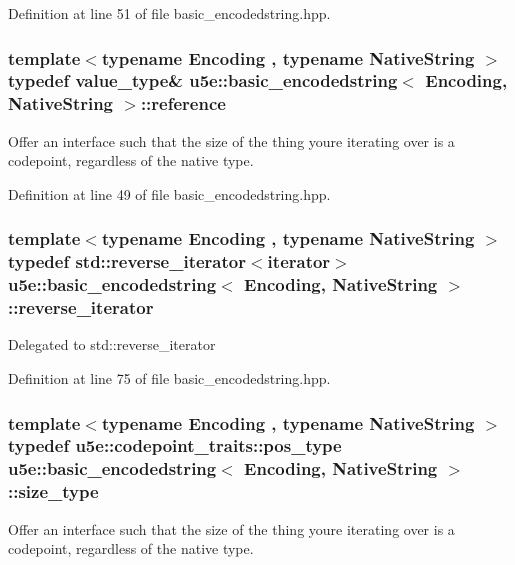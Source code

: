 Definition at line 51 of file basic\+\_\+encodedstring.\+hpp.

\subsubsection[{\texorpdfstring{reference}{reference}}]{\setlength{\rightskip}{0pt plus 5cm}template$<$typename Encoding , typename Native\+String $>$ typedef {\bf value\+\_\+type}\& {\bf u5e\+::basic\+\_\+encodedstring}$<$ Encoding, Native\+String $>$\+::{\bf reference}}\hypertarget{classu5e_1_1basic__encodedstring_a543f128888d49bf71508d1e4c705aeba}{}\label{classu5e_1_1basic__encodedstring_a543f128888d49bf71508d1e4c705aeba}
Offer an interface such that the size of the thing you\textquotesingle{}re iterating over is a codepoint, regardless of the native type. 

Definition at line 49 of file basic\+\_\+encodedstring.\+hpp.

\subsubsection[{\texorpdfstring{reverse\+\_\+iterator}{reverse_iterator}}]{\setlength{\rightskip}{0pt plus 5cm}template$<$typename Encoding , typename Native\+String $>$ typedef std\+::reverse\+\_\+iterator$<${\bf iterator}$>$ {\bf u5e\+::basic\+\_\+encodedstring}$<$ Encoding, Native\+String $>$\+::{\bf reverse\+\_\+iterator}}\hypertarget{classu5e_1_1basic__encodedstring_ac41ff2456ae679490fffb9fa99cd01bb}{}\label{classu5e_1_1basic__encodedstring_ac41ff2456ae679490fffb9fa99cd01bb}
Delegated to std\+::reverse\+\_\+iterator 

Definition at line 75 of file basic\+\_\+encodedstring.\+hpp.

\subsubsection[{\texorpdfstring{size\+\_\+type}{size_type}}]{\setlength{\rightskip}{0pt plus 5cm}template$<$typename Encoding , typename Native\+String $>$ typedef {\bf u5e\+::codepoint\+\_\+traits\+::pos\+\_\+type} {\bf u5e\+::basic\+\_\+encodedstring}$<$ Encoding, Native\+String $>$\+::{\bf size\+\_\+type}}\hypertarget{classu5e_1_1basic__encodedstring_afba33e845bb625c7f80cb5874a14f957}{}\label{classu5e_1_1basic__encodedstring_afba33e845bb625c7f80cb5874a14f957}
Offer an interface such that the size of the thing you\textquotesingle{}re iterating over is a codepoint, regardless of the native type. 


